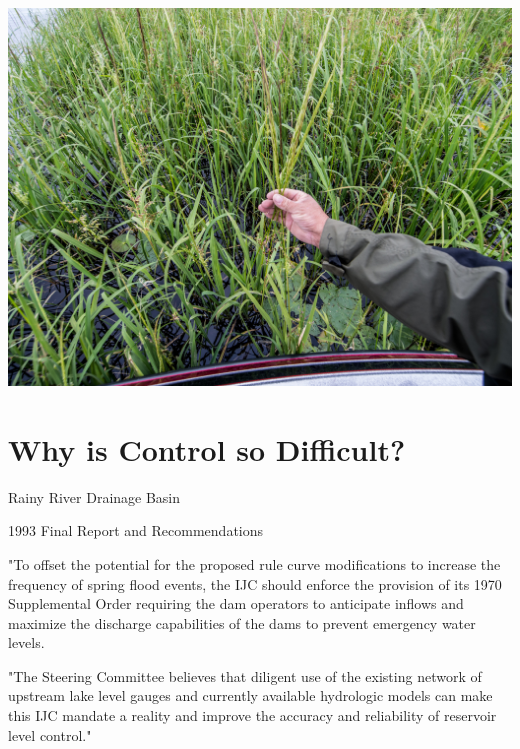 \documentclass[compress,english]{beamer}
\begin{document}
{\usebackgroundtemplate%
	{\includegraphics[height=\paperheight]{20150804_194209.jpg}}
\section{Why is Control so Difficult?}
}

\begin{frame}{Rainy River Drainage Basin}

\begin{center}
\end{center}

\end{frame}

\begin{frame}{1993 Final Report and Recommendations}

"{\color{red}To offset the potential for the proposed rule curve modifications to increase the frequency of spring flood events}, the IJC should enforce the provision of its 1970 Supplemental Order {\color{red} requiring the dam operators to anticipate inflows and maximize the discharge capabilities of the dams to prevent emergency water levels}. 

\vfill

"The Steering Committee believes that {\color{red} diligent use of the existing network of upstream lake level gauges and currently available hydrologic models can make this IJC mandate a reality and improve the accuracy and reliability of reservoir level control}." 

\vfill

\vspace*{3mm}

\end{frame}
\end{document}
